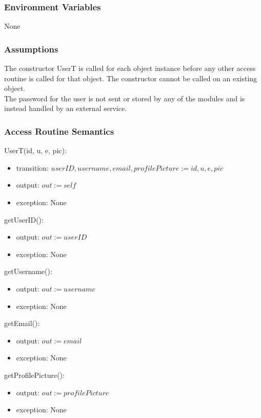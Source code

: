 \documentclass[12pt, titlepage]{article}
\begin{document}
\subsubsection{Environment Variables}
None

\subsubsection{Assumptions}
The constructor UserT is called for each object instance before any other access routine is called for that object. The constructor cannot be called on an existing object.\\

The password for the user is not sent or stored by any of the modules and is instead handled by an external service.

\subsubsection{Access Routine Semantics}

\noindent UserT(id, u, e, pic):
\begin{itemize}
\item transition: $userID, username, email, profilePicture := id, u, e, pic$
\item output: $out := self$
\item exception: None
\end{itemize}

\noindent getUserID():
\begin{itemize}
\item output: $out := userID$
\item exception: None
\end{itemize}

\noindent getUsername():
\begin{itemize}
\item output: $out := username$
\item exception: None
\end{itemize}

\noindent getEmail():
\begin{itemize}
\item output: $out := email$
\item exception: None
\end{itemize}

\noindent getProfilePicture():
\begin{itemize}
\item output: $out := profilePicture$
\item exception: None
\end{itemize}
\end{document}
